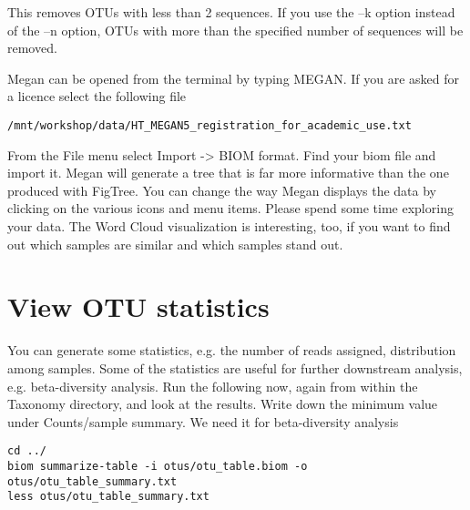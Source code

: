 \begin{note}
This removes OTUs with less than 2 sequences. If you use the –k option instead of the –n option, OTUs with more than the specified number of sequences will be removed.
\end{note}

\begin{steps}
Megan can be opened from the terminal by typing MEGAN. If you are asked for a licence select the following file 
\begin{lstlisting}
/mnt/workshop/data/HT_MEGAN5_registration_for_academic_use.txt 
\end{lstlisting}
\end{steps}

\begin{note}
\begin{description}[style=multiline,labelindent=0cm,align=right,leftmargin=\descriptionlabelspace,rightmargin=1.5cm,font=\ttfamily]

From the File menu select Import -> BIOM format. Find your biom file and import it. Megan will generate a tree that is far more informative than the one produced with FigTree. You can change the way Megan displays the data by clicking on the various icons and menu items. Please spend some time exploring your data. The Word Cloud visualization is interesting, too, if you want to find out which samples are similar and which samples stand out.
\end{description}
\end{note}

\section{View OTU statistics}

\begin{information}
You can generate some statistics, e.g. the number of reads assigned, distribution among samples. Some of the statistics are useful for further downstream analysis, e.g. beta-diversity analysis. Run the following now, again from within the Taxonomy directory, and look at the results. Write down the minimum value under Counts/sample summary. We need it for beta-diversity analysis
\end{information}

\begin{steps}
\begin{lstlisting}
cd ../
biom summarize-table -i otus/otu_table.biom -o otus/otu_table_summary.txt
less otus/otu_table_summary.txt
\end{lstlisting}
\end{steps}


